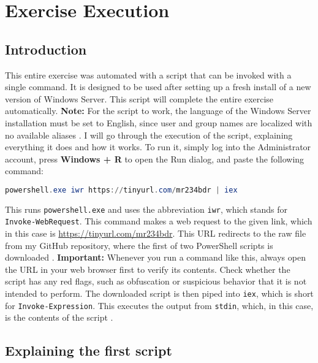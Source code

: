 \documentclass[a4paper]{article}
\newcommand{\abc}{\hfill \break}
\begin{document}
\newpage

\section{Exercise Execution}

\subsection{Introduction}
This entire exercise was automated with a script that can be invoked with a single command. It is designed to be used after setting up a fresh install of a new version of Windows Server. This script will complete the entire exercise automatically.\abc
\textbf{Note:} For the script to work, the language of the Windows Server installation must be set to English, since user and group names are localized with no available aliases \cite{localized}.\abc
I will go through the execution of the script, explaining everything it does and how it works.\abc
To run it, simply log into the Administrator account, press \textbf{Windows + R} to open the Run dialog, and paste the following command:
\begin{lstlisting}[language=PowerShell]
powershell.exe iwr https://tinyurl.com/mr234bdr | iex
\end{lstlisting}
This runs \texttt{powershell.exe} and uses the abbreviation \texttt{iwr}, which stands for \texttt{Invoke-WebRequest}. This command makes a web request to the given link, which in this case is \url{https://tinyurl.com/mr234bdr}. \abc
This URL redirects to the raw file from my GitHub repository, where the first of two PowerShell scripts is downloaded \cite{Invoke-WebRequest}.
\textbf{Important:} Whenever you run a command like this, always open the URL in your web browser first to verify its contents. Check whether the script has any red flags, such as obfuscation or suspicious behavior that it is not intended to perform.
The downloaded script is then piped into \texttt{iex}, which is short for \texttt{Invoke-Expression}. This executes the output from \texttt{stdin}, which, in this case, is the contents of the script \cite{abbriviation-table,Invoke-Expression}.

\subsection{Explaining the first script}
\end{document}
